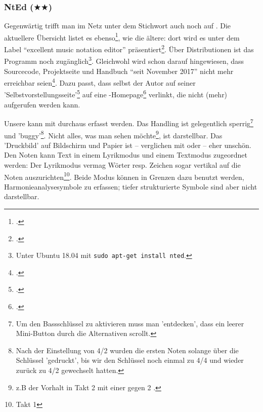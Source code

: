 %
%
%



\subsubsection{NtEd ($\bigstar$$\bigstar$)}
 
\label{NtEd}Gegenwärtig trifft man im Netz unter dem Stichwort
 auch noch auf . Die aktuellere Übersicht
listet es ebenso\footcite[vgl.][\nopage wp]{WpedNotensatz2019a}, wie die ältere:
dort wird es unter dem Label \enquote{excellent music notation editor}
präsentiert\footcite[vgl.][\nopage wp]{LinuxSoundNotation2006a}. Über
Distributionen ist das Programm noch zugänglich\footnote{Unter Ubuntu 18.04 mit
\texttt{sudo apt-get install nted}.}. Gleichwohl wird schon darauf hingewiesen,
dass Sourcecode, Projektseite und Handbuch \enquote{seit November 2017} nicht
mehr erreichbar seien\footcite[vgl.][\nopage wp]{UbuntuNtEd2016a}.
Dazu passt, dass selbst der Autor  auf seiner
'Selbstvorstellungsseite'\footcite[vgl.][\nopage wp]{Andres2018a} auf eine
-Homepage\footcite[vgl.][\nopage wp]{Andres2018b} verlinkt, die nicht
(mehr) aufgerufen werden kann.
 
Unsere  kann mit  durchaus erfasst werden. Das
Handling ist gelegentlich sperrig\footnote{Um den Bassschlüssel zu aktivieren
muss man 'entdecken', dass ein leerer Mini-Button durch die Alternativen
scrollt.} und 'buggy'\footnote{Nach der Einstellung von 4/2 wurden die ersten
Noten solange über die Schlüssel 'gedruckt', bis wir den Schlüssel noch einmal
zu 4/4 und wieder zurück zu 4/2 gewechselt hatten.}. Nicht alles, was man sehen
möchte\footnote{z.B der Vorhalt in Takt 2 mit einer \Halb gegen 2 \Vier.}, ist
darstellbar. Das 'Druckbild' auf Bildschirm und Papier ist -- verglichen mit
 oder  -- eher unschön. Den Noten kann Text in
einem Lyrikmodus und einem Textmodus zugeordnet werden: Der Lyrikmodus vermag
Wörter resp. Zeichen sogar vertikal auf die Noten auszurichten\footnote{Takt 1}.
Beide Modus können in Grenzen dazu benutzt werden, Harmonieanalysesymbole zu
erfassen; tiefer strukturierte Symbole sind aber nicht darstellbar.

